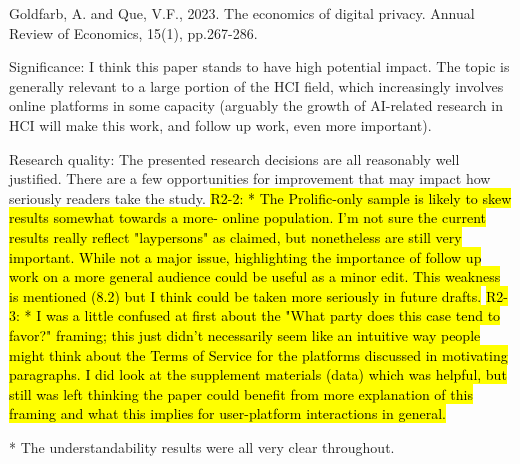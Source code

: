 Goldfarb, A. and Que, V.F., 2023. The economics of digital privacy. Annual Review
of Economics, 15(1), pp.267-286.

Significance: I think this paper stands to have high potential impact. The topic
is generally relevant to a large portion of the HCI field, which
increasingly involves online platforms in some capacity (arguably the
growth of AI-related research in HCI will make this work, and follow
up work, even more important).


Research quality: The presented research decisions are all reasonably well
justified. There are a few opportunities for improvement that may
impact how seriously readers take the study.
\hl{R2-2: * The Prolific-only sample is likely to skew results somewhat towards a more-
online population. I'm not sure the current results really reflect
"laypersons" as claimed, but nonetheless are still very important.
While not a major issue, highlighting the importance of follow up work
on a more general audience could be useful as a minor edit. This
weakness is mentioned (8.2) but I think could be taken more seriously
in future drafts.
}
\hl{R2-3: * I was a little confused at first about the "What party does this case tend to
favor?" framing; this just didn't necessarily seem like an intuitive
way people might think about the Terms of Service for the platforms
discussed in motivating paragraphs. I did look at the supplement
materials (data) which was helpful, but still was left thinking the
paper could benefit from more explanation of this framing and what
this implies for user-platform interactions in general.
}

* The understandability results were all very clear throughout.

